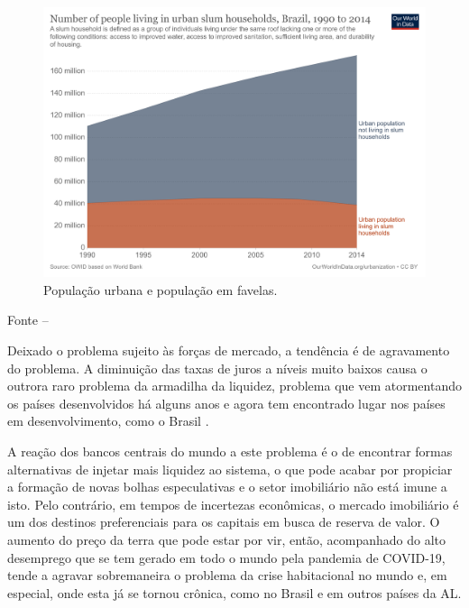 \documentclass[
	12pt,				%
	oneside,			%
	a4paper,			%
	chapter=TITLE,		%
	section=TITLE,		%
	english,			%
	brazil				%
	]{abntex2}
\newcommand{\bcenter}{\begin{center}}
\newcommand{\ecenter}{\end{center}}
\begin{document}
\begin{refsection}
\begin{figure}[H]
{\centering \includegraphics[width=0.7\linewidth]{images/urban-pop-in-out-of-slums} 

}

\caption{População urbana e população em favelas.}\label{fig:slums}
\end{figure}
\bcenter

\small Fonte -- \textcite{ritchie_urbanization_2018}
\ecenter

Deixado o problema sujeito às forças de mercado, a tendência é de agravamento do
problema. A diminuição das taxas de juros a níveis muito baixos causa o
outrora raro problema da armadilha da liquidez, problema que vem atormentando os
países desenvolvidos há alguns anos e agora tem encontrado lugar nos países em
desenvolvimento, como o Brasil \autocite{krugman-emergentes}.

A reação dos bancos centrais do mundo a este problema é o de encontrar formas
alternativas de injetar mais liquidez ao sistema, o que pode acabar por
propiciar a formação de novas bolhas especulativas e o setor imobiliário não
está imune a isto. Pelo contrário, em tempos de incertezas econômicas, o
mercado imobiliário é um dos destinos preferenciais para os capitais em busca
de reserva de valor. O aumento do preço da terra que pode estar por vir, então,
acompanhado do alto desemprego que se tem gerado em todo o mundo pela pandemia
de COVID-19, tende a agravar sobremaneira o problema da crise habitacional no
mundo e, em especial, onde esta já se tornou crônica, como no Brasil e em outros
países da \gls{AL}.


\end{refsection}
\end{document}
